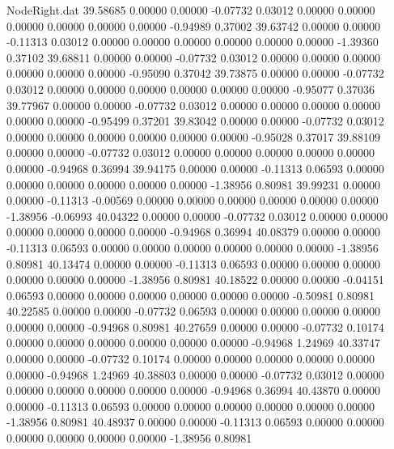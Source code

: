 \begin{filecontents}{NodeRight.dat}
  39.58685    0.00000    0.00000    -0.07732    0.03012    0.00000    0.00000    0.00000    0.00000    0.00000    0.00000   -0.94989    0.37002
  39.63742    0.00000    0.00000    -0.11313    0.03012    0.00000    0.00000    0.00000    0.00000    0.00000    0.00000   -1.39360    0.37102
  39.68811    0.00000    0.00000    -0.07732    0.03012    0.00000    0.00000    0.00000    0.00000    0.00000    0.00000   -0.95090    0.37042
  39.73875    0.00000    0.00000    -0.07732    0.03012    0.00000    0.00000    0.00000    0.00000    0.00000    0.00000   -0.95077    0.37036
  39.77967    0.00000    0.00000    -0.07732    0.03012    0.00000    0.00000    0.00000    0.00000    0.00000    0.00000   -0.95499    0.37201
  39.83042    0.00000    0.00000    -0.07732    0.03012    0.00000    0.00000    0.00000    0.00000    0.00000    0.00000   -0.95028    0.37017
  39.88109    0.00000    0.00000    -0.07732    0.03012    0.00000    0.00000    0.00000    0.00000    0.00000    0.00000   -0.94968    0.36994
  39.94175    0.00000    0.00000    -0.11313    0.06593    0.00000    0.00000    0.00000    0.00000    0.00000    0.00000   -1.38956    0.80981
  39.99231    0.00000    0.00000    -0.11313   -0.00569    0.00000    0.00000    0.00000    0.00000    0.00000    0.00000   -1.38956   -0.06993
  40.04322    0.00000    0.00000    -0.07732    0.03012    0.00000    0.00000    0.00000    0.00000    0.00000    0.00000   -0.94968    0.36994
  40.08379    0.00000    0.00000    -0.11313    0.06593    0.00000    0.00000    0.00000    0.00000    0.00000    0.00000   -1.38956    0.80981
  40.13474    0.00000    0.00000    -0.11313    0.06593    0.00000    0.00000    0.00000    0.00000    0.00000    0.00000   -1.38956    0.80981
  40.18522    0.00000    0.00000    -0.04151    0.06593    0.00000    0.00000    0.00000    0.00000    0.00000    0.00000   -0.50981    0.80981
  40.22585    0.00000    0.00000    -0.07732    0.06593    0.00000    0.00000    0.00000    0.00000    0.00000    0.00000   -0.94968    0.80981
  40.27659    0.00000    0.00000    -0.07732    0.10174    0.00000    0.00000    0.00000    0.00000    0.00000    0.00000   -0.94968    1.24969
  40.33747    0.00000    0.00000    -0.07732    0.10174    0.00000    0.00000    0.00000    0.00000    0.00000    0.00000   -0.94968    1.24969
  40.38803    0.00000    0.00000    -0.07732    0.03012    0.00000    0.00000    0.00000    0.00000    0.00000    0.00000   -0.94968    0.36994
  40.43870    0.00000    0.00000    -0.11313    0.06593    0.00000    0.00000    0.00000    0.00000    0.00000    0.00000   -1.38956    0.80981
  40.48937    0.00000    0.00000    -0.11313    0.06593    0.00000    0.00000    0.00000    0.00000    0.00000    0.00000   -1.38956    0.80981

\end{filecontents}
